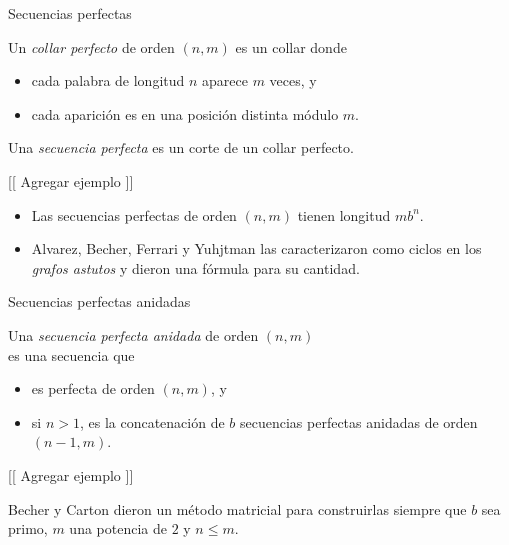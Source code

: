 \documentclass[spanish,xcolor={table}]{beamer}
\begin{document}
\begin{frame}{Secuencias perfectas}
  \begin{definition}
    Un \emph{collar perfecto} de orden $(n,m)$ es un collar donde
    \begin{itemize}
      \item cada palabra de longitud $n$ aparece $m$ veces, y
      \item cada aparición es en una posición distinta módulo $m$.
    \end{itemize}
    \medskip
    Una \emph{secuencia perfecta} es un corte de un collar perfecto.
  \end{definition}
  
  \begin{example}
    {[[ Agregar ejemplo ]]}
  \end{example}

  \begin{itemize}
    \item Las secuencias perfectas de orden $(n,m)$ tienen longitud $mb^n$.
    \item Alvarez, Becher, Ferrari y Yuhjtman las caracterizaron como ciclos
    en los \emph{grafos astutos} y dieron una fórmula para su cantidad.
  \end{itemize}
  
\end{frame}


\begin{frame}{Secuencias perfectas anidadas}

\begin{definition}
  Una \emph{secuencia perfecta anidada} de orden $(n,m)$ \\
  es una secuencia que
  \begin{itemize}
    \item es perfecta de orden $(n,m)$, y
    \item si $n > 1$, es la concatenación de $b$ secuencias perfectas anidadas
    de orden $(n-1, m)$.
  \end{itemize}
\end{definition}

\begin{example}
{[[ Agregar ejemplo ]]}
\end{example}

Becher y Carton dieron un método matricial para construirlas siempre
que $b$ sea primo, $m$ una potencia de $2$ y $n \leq m$.
\end{frame}
\end{document}
